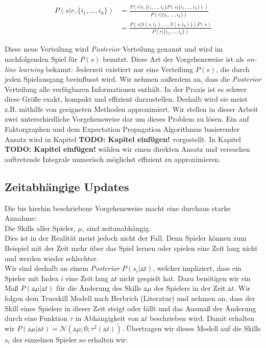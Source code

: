 \documentclass[12pt,a4paper]{scrartcl}
\numberwithin{equation}{section}
\begin{document}
\begin{equation}
 \begin{split}
 P(s|r,\{i_1,...,i_k\}) &= \frac{P(r|s,\{i_1,...,i_k\}P(s|\{i_1,...,i_k\}))}{P(r|\{i_1,...,i_k\})} \\ 
 &= \frac{P(s|S(s,i_1),...,S(s,i_k)\})P(s)}{P(r|\{i_1,...,i_k\})}
 \end{split}
 \end{equation}

Diese neue Verteilung wird \textit{Posterior} Verteilung genannt und wird im nachfolgenden Spiel für $P(s)$ benutzt.
Diese Art der Vorgehensweise ist als \textit{on-line learning} bekannt: Jederzeit existiert nur eine Verteilung $P(s)$, die durch jeden Spielausgang
beeinflusst wird. Wir nehmen außerdem an, dass die \textit{Posterior} Verteilung alle verfügbaren Informationen enthält. In der Praxis ist es schwer diese Größe exakt, kompakt 
und effizient darzustellen. Deshalb wird sie meist z.B. mithilfe von geeigneten Methoden approximiert. 
Wir stellen in dieser Arbeit zwei unterschiedliche Vorgehensweise dar um dieses Problem zu lösen. Ein auf Faktorgraphen und dem Expectation Propagation Algorithmus basierender Ansatz wird in Kapitel
\textbf{TODO: Kapitel einfügen!} vorgestellt. In Kapitel \textbf{TODO: Kapitel einfügen!} wählen wir einen direkten Ansatz und versuchen auftretende Integrale numerisch möglichst effizient zu approximieren. 

\subsection{Zeitabhängige Updates}

Die bis hierhin beschriebene Vorgehensweise macht eine durchaus starke Annahme: \\
Die Skills aller Spieler, $\mu$, sind zeitunabhängig.\\
Dies ist in der Realität meist jedoch nicht der Fall. Denn Spieler können zum Beispiel mit der Zeit mehr über das Spiel lernen oder spielen eine Zeit lang nicht und 
werden wieder schlechter. 
\\
Wir sind deshalb an einem \textit{Posterior} $P(s_i| \vartriangle t)$, welcher impliziert, dass ein Spieler mit Index $i$ eine Zeit lang $\vartriangle t$ nicht gespielt hat.
Dazu benötigen wir ein Maß $P(\vartriangle \mu | \vartriangle t)$ für die Änderung des Skills $\vartriangle \mu$ des Spielers in der Zeit $\vartriangle t$.
Wir folgen dem Trueskill Modell nach Herbrich (Literatur) und nehmen an, dass der Skill eines Spielers in dieser Zeit steigt oder fällt und das Ausmaß der Änderung durch eine Funktion $\tau$ in
Abhängigkeit von $\vartriangle t$ beschrieben wird.
Damit erhalten wir $P(\vartriangle \mu | \vartriangle t) = \mathcal{N}(\vartriangle \mu; 0;\tau^2(\vartriangle t))$.
Übertragen wir dieses Modell auf die Skills $s_i$ der einzelnen Spieler so erhalten wir: 
\end{document}
